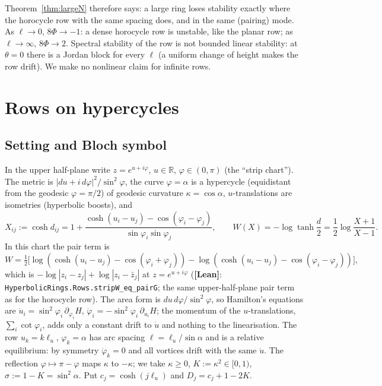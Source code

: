 \documentclass[11pt]{article}
\theoremstyle{definition}
\theoremstyle{remark}
\newcommand{\st}[1]{\textbf{[#1]}}
\newcommand{\lean}[1]{\nolinkurl{#1}}
\begin{document}
Theorem~\ref{thm:largeN} therefore says: a large ring loses stability exactly where the horocycle row with the same spacing does,
and in the same (pairing) mode. As $\ell\to0$, $8\Phi\to-1$: a dense horocycle row is unstable, like the planar row; as
$\ell\to\infty$, $8\Phi\to2$. Spectral stability of the row is not bounded linear stability: at $\theta=0$ there is a Jordan block
for every $\ell$ (a uniform change of height makes the row drift). We make no nonlinear claim for infinite rows.

\section{Rows on hypercycles}\label{sec:hyper}

\subsection{Setting and Bloch symbol}
In the upper half-plane write $z=e^{u+i\varphi}$, $u\in\mathbb R$, $\varphi\in(0,\pi)$ (the ``strip chart''). The metric is
$|du+i\,d\varphi|^2/\sin^2\varphi$, the curve $\varphi=\alpha$ is a hypercycle (equidistant from the geodesic $\varphi=\pi/2$) of
geodesic curvature $\kappa=\cos\alpha$, $u$-translations are isometries (hyperbolic boosts), and
\[
X_{ij}:=\cosh d_{ij}=1+\frac{\cosh(u_i-u_j)-\cos(\varphi_i-\varphi_j)}{\sin\varphi_i\sin\varphi_j},\qquad
W(X)=-\log\tanh\frac d2=\frac12\log\frac{X+1}{X-1}.
\]
In this chart the pair term is
\begin{equation}\label{eq:stripW}
W=\tfrac12\big[\log(\cosh(u_i-u_j)-\cos(\varphi_i+\varphi_j))-\log(\cosh(u_i-u_j)-\cos(\varphi_i-\varphi_j))\big],
\end{equation}
which is $-\log|z_i-z_j|+\log|z_i-\bar z_j|$ at $z=e^{u+i\varphi}$ (\st{Lean}: \lean{HyperbolicRings.Rows.stripW_eq_pairG}; the same upper-half-plane
pair term as for the horocycle row). The area form is $du\,d\varphi/\sin^2\varphi$, so
Hamilton's equations are $\dot u_i=\sin^2\varphi_i\,\partial_{\varphi_i}H$, $\dot\varphi_i=-\sin^2\varphi_i\,\partial_{u_i}H$; the momentum of the
$u$-translations, $\sum_i\cot\varphi_i$, adds only a constant drift to $\dot u$ and nothing to the linearisation. The row
$u_k=k\ell_u$, $\varphi_k=\alpha$ has arc spacing $\ell=\ell_u/\sin\alpha$ and is a relative equilibrium: by symmetry
$\dot\varphi_k=0$ and all vortices drift with the same $\dot u$. The reflection $\varphi\mapsto\pi-\varphi$ maps $\kappa$ to $-\kappa$;
we take $\kappa\ge0$, $K:=\kappa^2\in[0,1)$, $\sigma :=1-K=\sin^2\alpha$. Put $c_j=\cosh(j\ell_u)$ and $D_j=c_j+1-2K$.
\end{document}
